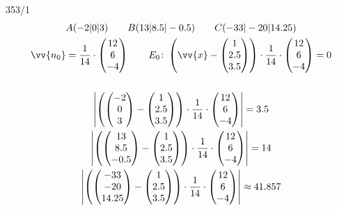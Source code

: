 \begin{exercise}{353/1}
\begin{gather*}
    A(-2|0|3) \qquad B(13|8.5|-0.5) \qquad C(-33|-20|14.25) \\
    \vv{n_0} = \frac{1}{14} \cdot \begin{pmatrix}12 \\ 6 \\ -4\end{pmatrix} \qquad E_0 \colon \left(\vv{x} - \begin{pmatrix}1 \\ 2.5 \\ 3.5\end{pmatrix}\right) \cdot \frac{1}{14} \cdot \begin{pmatrix}12 \\ 6 \\ -4\end{pmatrix} = 0 \\\\
    \left|\left(\begin{pmatrix}-2 \\ 0 \\ 3\end{pmatrix} - \begin{pmatrix}1 \\ 2.5 \\ 3.5\end{pmatrix}\right) \cdot \frac{1}{14} \cdot \begin{pmatrix}12 \\ 6 \\ -4\end{pmatrix}\right| = 3.5 \\
    \left|\left(\begin{pmatrix}13 \\ 8.5 \\ -0.5\end{pmatrix} - \begin{pmatrix}1 \\ 2.5 \\ 3.5\end{pmatrix}\right) \cdot \frac{1}{14} \cdot \begin{pmatrix}12 \\ 6 \\ -4\end{pmatrix}\right| = 14 \\
    \left|\left(\begin{pmatrix}-33 \\ -20 \\ 14.25\end{pmatrix} - \begin{pmatrix}1 \\ 2.5 \\ 3.5\end{pmatrix}\right) \cdot \frac{1}{14} \cdot \begin{pmatrix}12 \\ 6 \\ -4\end{pmatrix}\right| \approx 41.857

\end{gather*}
\end{exercise}
